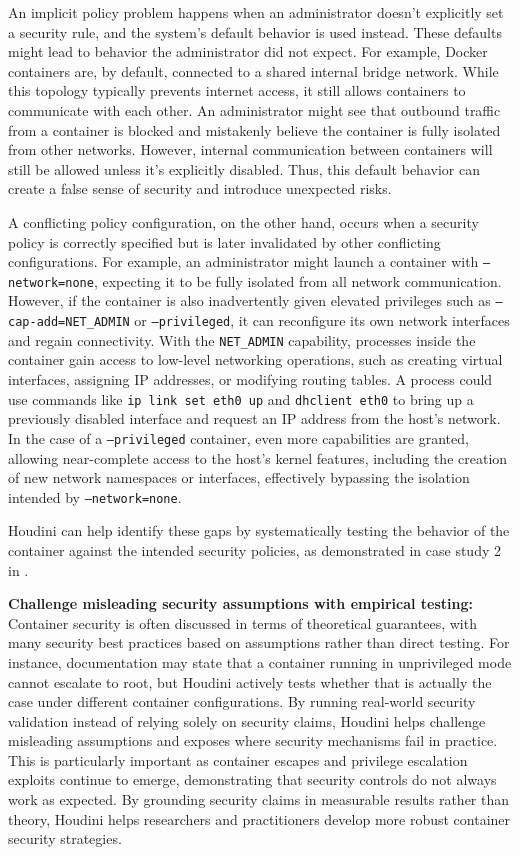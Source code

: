 \documentclass[12pt]{report}
\begin{document}
\begin{doublespace}
An implicit policy problem happens when an administrator doesn't explicitly set a security rule, and the system's default behavior is used instead. These defaults might lead to behavior the administrator did not expect. For example, Docker containers are, by default, connected to a shared internal bridge network. While this topology typically prevents internet access, it still allows containers to communicate with each other. An administrator might see that outbound traffic from a container is blocked and mistakenly believe the container is fully isolated from other networks. However, internal communication between containers will still be allowed unless it's explicitly disabled. Thus, this default behavior can create a false sense of security and introduce unexpected risks.

A conflicting policy configuration, on the other hand, occurs when a security policy is correctly specified but is later invalidated by other conflicting configurations. For example, an administrator might launch a container with \texttt{--network=none}, expecting it to be fully isolated from all network communication. However, if the container is also inadvertently given elevated privileges such as \texttt{--cap-add=NET\_ADMIN} or \texttt{--privileged}, it can reconfigure its own network interfaces and regain connectivity. With the \texttt{NET\_ADMIN} capability, processes inside the container gain access to low-level networking operations, such as creating virtual interfaces, assigning IP addresses, or modifying routing tables. A process could use commands like \texttt{ip link set eth0 up} and \texttt{dhclient eth0} to bring up a previously disabled interface and request an IP address from the host’s network. In the case of a \texttt{--privileged} container, even more capabilities are granted, allowing near-complete access to the host's kernel features, including the creation of new network namespaces or interfaces, effectively bypassing the isolation intended by \texttt{--network=none}.

Houdini can help identify these gaps by systematically testing the behavior of the container against the intended security policies, as demonstrated in case study 2 in .

\noindent\textbf{Challenge misleading security assumptions with empirical testing:}
Container security is often discussed in terms of theoretical guarantees, with many security best practices based on assumptions rather than direct testing. For instance, documentation may state that a container running in unprivileged mode cannot escalate to root, but Houdini actively tests whether that is actually the case under different container configurations. By running real-world security validation instead of relying solely on security claims, Houdini helps challenge misleading assumptions and exposes where security mechanisms fail in practice. This is particularly important as container escapes and privilege escalation exploits continue to emerge, demonstrating that security controls do not always work as expected. By grounding security claims in measurable results rather than theory, Houdini helps researchers and practitioners develop more robust container security strategies.


\end{doublespace}
\end{document}
